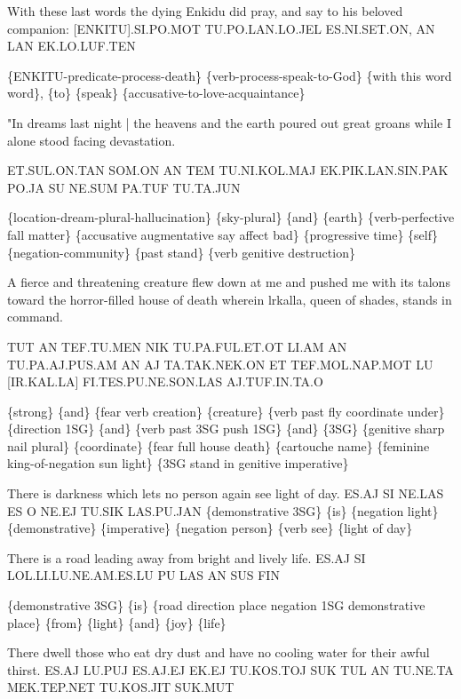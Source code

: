 With these last words the dying Enkidu did pray, and say to his beloved companion:  
 [ENKITU].SI.PO.MOT TU.PO.LAN.LO.JEL ES.NI.SET.ON, AN LAN EK.LO.LUF.TEN 

\{ENKITU-predicate-process-death\} \{verb-process-speak-to-God\} \{with this word word\}, \{to\} \{speak\} \{accusative-to-love-acquaintance\} 

 
 

"In dreams last night | the heavens and the earth poured out great groans while I alone stood facing devastation.  

ET.SUL.ON.TAN SOM.ON AN TEM TU.NI.KOL.MAJ EK.PIK.LAN.SIN.PAK PO.JA SU NE.SUM PA.TUF TU.TA.JUN 

\{location-dream-plural-hallucination\} \{sky-plural\} \{and\} \{earth\} \{verb-perfective fall matter\} \{accusative augmentative say affect bad\} \{progressive time\} \{self\} \{negation-community\} \{past stand\} \{verb genitive destruction\} 

 
 

A fierce and threatening creature flew down at me and pushed me with its talons toward the horror-filled house of death wherein lrkalla, queen of shades, stands in command.  

TUT AN TEF.TU.MEN NIK TU.PA.FUL.ET.OT LI.AM AN TU.PA.AJ.PUS.AM AN AJ TA.TAK.NEK.ON ET TEF.MOL.NAP.MOT LU [IR.KAL.LA] FI.TES.PU.NE.SON.LAS AJ.TUF.IN.TA.O 

\{strong\} \{and\} \{fear verb creation\} \{creature\} \{verb past fly coordinate under\} \{direction 1SG\} \{and\} \{verb past 3SG push 1SG\} \{and\} \{3SG\} \{genitive sharp nail plural\} \{coordinate\} \{fear full house death\} \{cartouche name\} \{feminine king-of-negation sun light\} \{3SG stand in genitive imperative\} 

 
 

There is darkness which lets no person again see light of day.  
 ES.AJ SI NE.LAS ES O NE.EJ TU.SIK LAS.PU.JAN 
 \{demonstrative 3SG\} \{is\} \{negation light\} \{demonstrative\} \{imperative\} \{negation person\} \{verb see\} \{light of day\} 

 
 

There is a road leading away from bright and lively life.  
 ES.AJ SI LOL.LI.LU.NE.AM.ES.LU PU LAS AN SUS FIN 

\{demonstrative 3SG\} \{is\} \{road direction place negation 1SG demonstrative place\} \{from\} \{light\} \{and\} \{joy\} \{life\} 

 
 

There dwell those who eat dry dust and have no cooling water for their awful thirst.  
 ES.AJ LU.PUJ ES.AJ.EJ EK.EJ TU.KOS.TOJ SUK TUL AN TU.NE.TA MEK.TEP.NET TU.KOS.JIT SUK.MUT 

